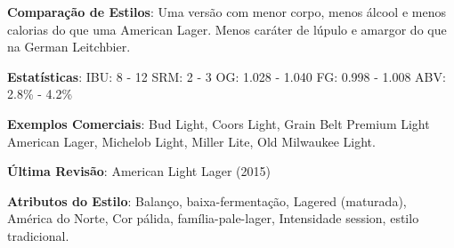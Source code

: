 \textbf{Comparação de Estilos}: Uma versão com menor corpo, menos álcool
e menos calorias do que uma American Lager. Menos caráter de lúpulo e
amargor do que na German Leitchbier.

\textbf{Estatísticas}: IBU: 8 - 12 SRM: 2 - 3 OG: 1.028 - 1.040 FG:
0.998 - 1.008 ABV: 2.8\% - 4.2\%

\textbf{Exemplos Comerciais}: Bud Light, Coors Light, Grain Belt Premium
Light American Lager, Michelob Light, Miller Lite, Old Milwaukee Light.

\textbf{Última Revisão}: American Light Lager (2015)

\textbf{Atributos do Estilo}: Balanço, baixa-fermentação, Lagered
(maturada), América do Norte, Cor pálida, família-pale-lager,
Intensidade session, estilo tradicional.
